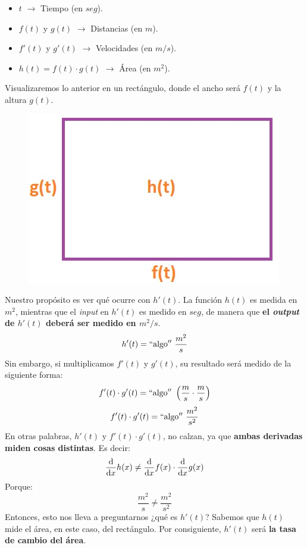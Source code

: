 \documentclass[12pt]{article}
\begin{document}
\begin{itemize}
\item $t$ $\rightarrow$ Tiempo (en $seg$).
\item $f(t)$ y $g(t)$ $\rightarrow$ Distancias (en $m$).
\item $f'(t)$ y $g'(t)$ $\rightarrow$ Velocidades (en $m/s$).
\item $h(t) = f(t) \cdot g(t)$ $\rightarrow$ Área (en $m^{2}$).
\end{itemize}

Visualizaremos lo anterior en un rectángulo, donde el ancho será $f(t)$ y la altura $g(t)$.

\newpage

\begin{figure}[hbt!]
\centering
\includegraphics[scale=0.7]{img/deriv_prod_examp.jpg}
\end{figure}

Nuestro propósito es ver qué ocurre con $h'(t)$. La función $h(t)$ es medida en $m^{2}$, mientras que el \textit{input} en $h'(t)$ es medido en $seg$, de manera que \textbf{el \textit{output} de $h'(t)$ deberá ser medido en $m^{2}/s$}.
\[h'(t) = \mathrm{``algo''} \ \frac{m^{2}}{s}\]
Sin embargo, si multiplicamos $f'(t)$ y $g'(t)$, su resultado será medido de la siguiente forma:
\[f'(t) \cdot g'(t) = \mathrm{``algo''} \ \left(\frac{m}{s} \cdot \frac{m}{s}\right)\]
\[f'(t) \cdot g'(t) = \mathrm{``algo''} \ \frac{m^{2}}{s^{2}}\]
En otras palabras, $h'(t)$ y $f'(t) \cdot g'(t)$, no calzan, ya que \textbf{ambas derivadas miden cosas distintas}. Es decir:
\[\diff*{h(x)}x \neq \diff*{f(x)}x \cdot \diff*{g(x)}x\]
Porque:
\[\frac{m^{2}}{s} \neq \frac{m^{2}}{s^{2}}\]
Entonces, esto nos lleva a preguntarnos ¿qué es $h'(t)$? Sabemos que $h(t)$ mide el área, en este caso, del rectángulo. Por consiguiente, $h'(t)$ será \textbf{la tasa de cambio del área}.
\end{document}
